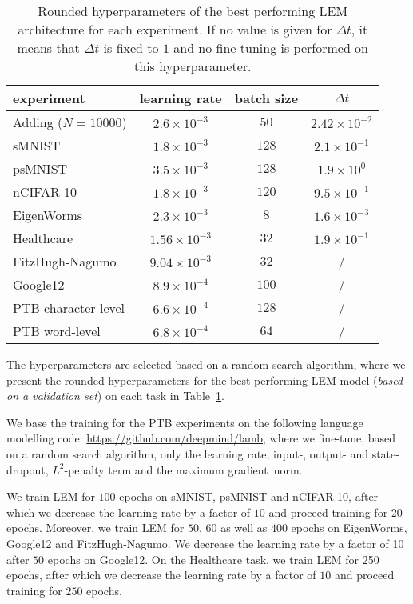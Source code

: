 \documentclass{article} \usepackage{iclr2022_conference,times}
\newcommand{\Dt}{{\Delta t}}
\newcommand{\Tref}[1]{Table~\ref{#1}}
\begin{document}
\begin{table}[ht!]
  \caption{Rounded hyperparameters of the best performing LEM architecture for each experiment. If no value is given for $\Dt$, it means that $\Dt$ is fixed to $1$ and no fine-tuning is performed on this hyperparameter.}
  \label{tab:hyperparameters_rounded}
  \centering
  \begin{tabular}{lccc}
    \toprule
    \cmidrule(r){1-4}
    experiment & learning rate & batch size  & $\Dt$ \\
    \midrule
Adding ($N=10000$) & $2.6\times 10^{-3}$ & $50$ & $2.42 \times 10^{-2}$\\
sMNIST & $1.8\times 10^{-3}$ & $128$ & $2.1\times 10^{-1}$ \\
psMNIST & $3.5\times 10^{-3}$ & $128$ & $1.9\times10^0$ \\
nCIFAR-10  & $1.8\times 10^{-3}$ & $120$ & $9.5\times 10^{-1}$ \\
EigenWorms  & $2.3\times 10^{-3}$ & $8$ & $1.6\times 10^{-3}$ \\
Healthcare & $1.56\times 10^{-3}$ & $32$ & $1.9\times 10^{-1}$ \\
FitzHugh-Nagumo &$9.04\times 10^{-3}$ & $32$ & / \\
Google12 & $8.9\times 10^{-4}$ & $100$ & / \\
PTB character-level & $6.6\times 10^{-4}$ & $128$ & / \\
PTB word-level & $6.8\times 10^{-4}$ & $64$ & / \\

    \bottomrule
  \end{tabular}
\end{table}

The hyperparameters are selected based on a random search algorithm, where we present the rounded hyperparameters for the best performing LEM model (\emph{based on a validation set}) on each task in \Tref{tab:hyperparameters_rounded}.

We base the training for the PTB experiments on the following language modelling code: \href{https://github.com/deepmind/lamb}{https://github.com/deepmind/lamb}, where we fine-tune, based on a random search algorithm, only the learning rate, input-, output- and state-dropout, $L^2$-penalty term and the maximum gradient~norm.

We train LEM for $100$ epochs on sMNIST, psMNIST and nCIFAR-10, after which we decrease the learning rate by a factor of $10$ and proceed training for $20$ epochs. Moreover, we train LEM for $50$, $60$ as well as $400$ epochs on EigenWorms, Google12 and FitzHugh-Nagumo. We decrease the learning rate by a factor of 10 after $50$ epochs on Google12. On the Healthcare task, we train LEM for 250 epochs, after which we decrease the learning rate by a factor of $10$ and proceed training for $250$ epochs.
\end{document}
